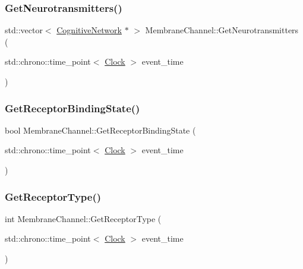 \mbox{\label{classMembraneChannel_a9fdb20eb7d3f9ebad864d07aaa835716}} 
\subsubsection{\texorpdfstring{Get\+Neurotransmitters()}{GetNeurotransmitters()}}
{\footnotesize\ttfamily std\+::vector$<$ \mbox{\hyperlink{classCognitiveNetwork}{Cognitive\+Network}} $\ast$ $>$ Membrane\+Channel\+::\+Get\+Neurotransmitters (\begin{DoxyParamCaption}\item[{std\+::chrono\+::time\+\_\+point$<$ \mbox{\hyperlink{universe_8h_a0ef8d951d1ca5ab3cfaf7ab4c7a6fd80}{Clock}} $>$}]{event\+\_\+time }\end{DoxyParamCaption})}

\mbox{\label{classMembraneChannel_a8eb115e2583e5bf0f37156f1fc974aa6}} 
\subsubsection{\texorpdfstring{Get\+Receptor\+Binding\+State()}{GetReceptorBindingState()}}
{\footnotesize\ttfamily bool Membrane\+Channel\+::\+Get\+Receptor\+Binding\+State (\begin{DoxyParamCaption}\item[{std\+::chrono\+::time\+\_\+point$<$ \mbox{\hyperlink{universe_8h_a0ef8d951d1ca5ab3cfaf7ab4c7a6fd80}{Clock}} $>$}]{event\+\_\+time }\end{DoxyParamCaption})\hspace{0.3cm}{\ttfamily [inline]}}

\mbox{\label{classMembraneChannel_aa37056ebb4e757a5ed00252112b516aa}} 
\subsubsection{\texorpdfstring{Get\+Receptor\+Type()}{GetReceptorType()}}
{\footnotesize\ttfamily int Membrane\+Channel\+::\+Get\+Receptor\+Type (\begin{DoxyParamCaption}\item[{std\+::chrono\+::time\+\_\+point$<$ \mbox{\hyperlink{universe_8h_a0ef8d951d1ca5ab3cfaf7ab4c7a6fd80}{Clock}} $>$}]{event\+\_\+time }\end{DoxyParamCaption})\hspace{0.3cm}{\ttfamily [inline]}}

